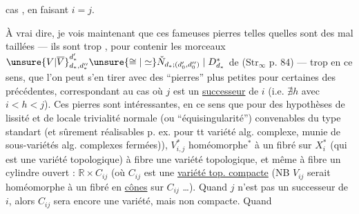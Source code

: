 cas , en faisant $i=j$.

À vrai dire, je vois maintenant que ces fameuses pierres telles quelles sont des  mal taillées — ils sont trop ,  pour contenir les morceaux $\unsure{V|\overline V}_{d_*,d''_*}^{d'_*}\unsure{\cong|\simeq}\check N_{d_*;(d'_0,d''_0)}\mid D_{d_*}^*$ de ($\mathrm{Str}_\infty$ p. 84) — trop en ce sens, que l'on peut s'en tirer avec des ``pierres'' plus petites pour  certaines des précédentes, correspondant au cas où $j$ est un \uline{successeur} de $i$ (i.e. $\nexists h$ avec $i<h<j$).
Ces pierres sont  intéressantes, en ce sens que pour des hypothèses de lissité et de locale trivialité normale (ou ``équisingularité'') convenables du type standart (et sûrement réalisables p. ex. pour tt variété alg. complexe, munie de sous-variétés alg. complexes fermées)), $V_{i,j}^*$  homéomorphe${}^*$ à un fibré sur $X_i^*$ (qui est une variété topologique) à fibre une variété topologique, et même à fibre un cylindre ouvert : $\mathbb R\times C_{ij}$  (où $C_{ij}$ est une \uline{variété top. compacte} (NB $V_{ij}$ serait homéomorphe à un fibré en \uline{cônes} sur $C_{ij}$ \ldots). Quand $j$ n'est pas un successeur de $i$, alors $C_{ij}$ sera encore une variété, mais non compacte. Quand


